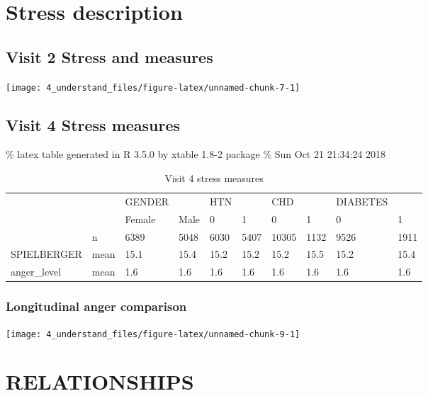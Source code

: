 \documentclass[10pt,]{tufte-handout}
\begin{document}
\hypertarget{stress-description}{%
\section{Stress description}\label{stress-description}}

\hypertarget{visit-2-stress-and-measures}{%
\subsection{Visit 2 Stress and
measures}\label{visit-2-stress-and-measures}}

\texttt{[image: 4\_understand\_files/figure-latex/unnamed-chunk-7-1]}

\hypertarget{visit-4-stress-measures}{%
\subsection{Visit 4 Stress measures}\label{visit-4-stress-measures}}

\% latex table generated in R 3.5.0 by xtable 1.8-2 package \% Sun Oct
21 21:34:24 2018

\begin{table}[ht]
\centering
\caption{Visit 4 stress measures} 
\begingroup\scriptsize
\begin{tabular}{llllllllll}
  \hline
  \hline
 &  & GENDER &  & HTN &  & CHD &  & DIABETES &  \\ 
   &  & Female & Male & 0 & 1 & 0 & 1 & 0 & 1 \\ 
   & n & 6389 & 5048 & 6030 & 5407 & 10305 & 1132 & 9526 & 1911 \\ 
  SPIELBERGER & mean & 15.1 & 15.4 & 15.2 & 15.2 & 15.2 & 15.5 & 15.2 & 15.4 \\ 
  anger\_level & mean &  1.6 &  1.6 &  1.6 &  1.6 &  1.6 &  1.6 &  1.6 &  1.6 \\ 
   \hline
\end{tabular}
\endgroup
\end{table}

\hypertarget{longitudinal-anger-comparison}{%
\subsubsection{Longitudinal anger
comparison}\label{longitudinal-anger-comparison}}

\texttt{[image: 4\_understand\_files/figure-latex/unnamed-chunk-9-1]}

\hypertarget{relationships}{%
\section{RELATIONSHIPS}\label{relationships}}
\end{document}
